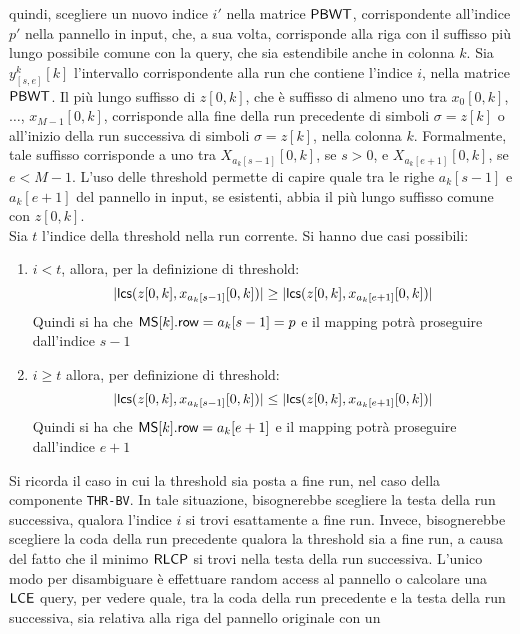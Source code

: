 quindi, scegliere un nuovo indice $i'$ nella matrice $\mbox{\rm {\sf PBWT}}$,
corrispondente all'indice $p'$ nella pannello in input, che, a sua volta,
corrisponde alla riga 
con il suffisso più lungo possibile comune con la query, che sia estendibile
anche in 
colonna $k$. Sia $y_{[s,e]}^k[k]$ l'intervallo corrispondente alla run che
contiene l'indice $i$, nella matrice $\mbox{\rm {\sf PBWT}}$. Il più lungo suffisso
di $z[0,k]$, che è suffisso di almeno uno tra $x_0[0,k]$, $\ldots$,
$x_{M-1}[0,k]$, corrisponde alla fine della run precedente di simboli
$\sigma=z[k]$ o all'inizio della run successiva di simboli
$\sigma=z[k]$, nella colonna $k$. Formalmente,
tale suffisso corrisponde a uno tra $X_{a_k[s-1]}[0,k]$, se $s>0$, e
$X_{a_k[e+1]}[0,k]$, se 
$e<M-1$. L'uso delle threshold permette di capire quale tra le righe $a_k[s-1]$
e $a_k[e+1]$ del pannello in input, se esistenti, abbia il più lungo suffisso
comune con $z[0,k]$. \\
Sia $t$ l'indice della threshold nella run corrente. Si hanno due casi
possibili:
\begin{enumerate}
  \item $i<t$, allora, per la definizione di threshold:
  \begin{equation}
    \label{eq:thrra2}
    |\mbox{\rm {\sf lcs}}(z[0,k], x_{a_{k}[s-1]}[0,k])|\geq |\mbox{\rm {\sf lcs}}(z[0,k], x_{a_{k}[e+1]}[0,k])|
  \end{equation}
  Quindi si ha che $\mbox{\rm {\sf MS}}[k].\mbox{\rm {\sf row}}=a_{k}[s-1]=p$ e il mapping potrà proseguire
  dall'indice $s-1$
  \item  $i\geq t$ allora, per definizione di threshold:
  \begin{equation}
    \label{eq:thrra1}
    |\mbox{\rm {\sf lcs}}(z[0,k], x_{a_{k}[s-1]}[0,k])|\leq |\mbox{\rm {\sf lcs}}(z[0,k], x_{a_{k}[e+1]}[0,k])|
  \end{equation}
  Quindi si ha che $\mbox{\rm {\sf MS}}[k].\mbox{\rm {\sf row}}=a_{k}[e+1]$ e il mapping potrà proseguire
  dall'indice $e+1$
\end{enumerate}
Si ricorda il caso in cui la threshold sia posta a fine run, nel caso
della componente \texttt{THR-BV}. In tale situazione, bisognerebbe scegliere la
testa della run successiva, qualora l'indice $i$ 
si trovi esattamente a fine run. Invece, bisognerebbe scegliere la coda della
run precedente qualora la
threshold sia a fine run, a causa del fatto che il minimo $\mbox{\rm {\sf RLCP}}$
si trovi nella testa della run successiva.
L'unico modo per disambiguare è effettuare random
access al pannello o calcolare una $\mbox{\rm {\sf LCE}}$ query, per vedere quale, tra la coda
della run precedente e la testa
della run successiva, sia relativa alla riga del pannello originale con un
